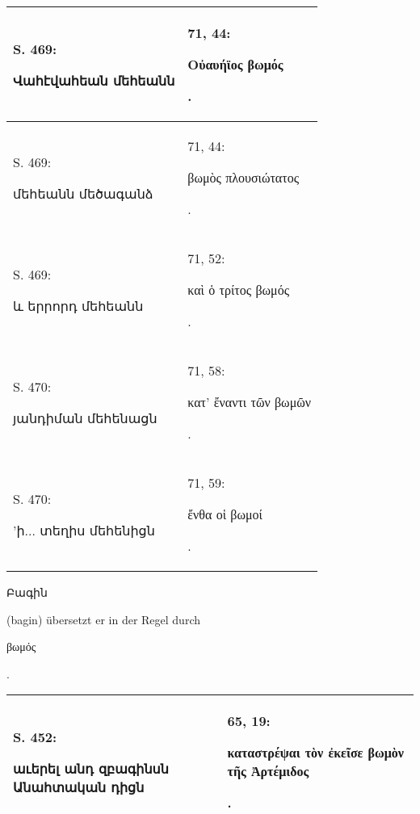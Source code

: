 \documentclass{article}
\begin{document}
{\begin{table}[H]
\begin{tabular}{p{45mm}|p{45mm}}
        S. 469: \begin{armenian}Վահէվահեան մեհեանն\end{armenian} & 71, 44: \begin{greek}Οὐαυήϊος βωμός\end{greek}.   \\ \hline
        S. 469: \begin{armenian}մեհեանն մեծագանձ\end{armenian} & 71, 44: \begin{greek}βωμὸς πλουσιώτατος\end{greek}.   \\ \hline
        S. 469: \begin{armenian}և երրորդ մեհեանն\end{armenian} & 71, 52: \begin{greek}καὶ ὁ τρίτος βωμός\end{greek}.   \\ \hline
        S. 470: \begin{armenian}յանդիման մեհենացն\end{armenian} & 71, 58: \begin{greek}κατ' ἔναντι τῶν βωμῶν\end{greek}.   \\ \hline
        S. 470: \begin{armenian}'ի... տեղիս մեհենիցն\end{armenian} & 71, 59: \begin{greek}ἔνθα οἱ βωμοί\end{greek}. \\ \hline
    \end{tabular}
\end{table}
\hspace*{5mm}\begin{armenian}Բագին\end{armenian} (bagin) übersetzt er in der Regel durch \begin{greek}βωμός\end{greek}.  
\begin{table}[H]
    \centering
    \footnotesize
    \begin{tabular}{p{45mm}|p{45mm}}
    \hline
        S. 452: \begin{armenian}աւերել անդ զբագինսն Անահտական դիցն\end{armenian} & 65, 19: \begin{greek}καταστρέψαι τὸν ἐκεῖσε βωμὸν τῆς Ἀρτέμιδος\end{greek}.   \\ \hline

\end{tabular}
\end{table}}
\end{document}
